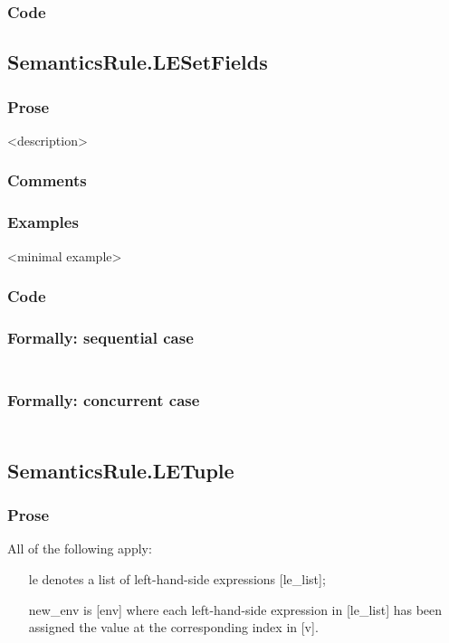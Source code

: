\documentclass{book}
\begin{document}
  \subsubsection{Code}

\subsection{SemanticsRule.LESetFields \label{sec:SemanticsRule.LESetFields}}

    \subsubsection{Prose}
    <description>

    \subsubsection{Comments}

    \subsubsection{Examples}
    <minimal example>

  \subsubsection{Code}

  \subsubsection{Formally: sequential case}
  \begin{align}
  \end{align} 

  \subsubsection{Formally: concurrent case}
  \begin{align}
  \end{align} 

\subsection{SemanticsRule.LETuple \label{sec:SemanticsRule.LETuple}}

    \subsubsection{Prose}
    All of the following apply:
    \begin{itemize}
    \item [le] denotes a list of left-hand-side expressions [le\_list];
    \item [new\_env] is [env] where each left-hand-side expression in [le\_list] has
      been assigned the value at the corresponding index in [v].
    \end{itemize}
\end{document}
